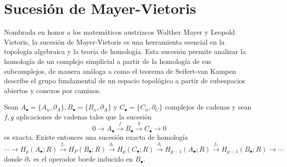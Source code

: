 \section{Sucesión de Mayer-Vietoris}
Nombrada en honor a los matemáticos austriacos Walther Mayer y Leopold Vietoris, la sucesión de Mayer-Vietoris es una herramienta esencial en la topología algebraica y la teoría de homología. Esta sucesión permite analizar la homología de un complejo simplicial a partir de la homología de sus subcomplejos, de manera análoga a como el teorema de Seifert-van Kampen describe el grupo fundamental de un espacio topológico a partir de subespacios abiertos y conexos por caminos.
\begin{lema}
	\label{lem:zig-zag}
	Sean $A_{\bullet} = \{A_n,\partial_A\}, B_{\bullet} = \{B_n,\partial_A\}$ y $C_{\bullet} = \{C_n,\partial_C\}$ complejos de cadenas y sean $f,g$ aplicaciones de cadenas tales que la sucesión
	\[
		0 \to A_{\bullet} \overset{f}{\to} B_{\bullet} \overset{g}{\to} C_{\bullet} \to 0
	\]
	es exacta. Existe entonces una sucesión exacta de homología
	\begin{equation}
		\label{eq:long-exact-hom}
	\cdots \to H_p(A_{\bullet};R) \overset{f_*}{\to} H_P(B_{\bullet};R) \overset{g_*}{\to} H_p(C_{\bullet};R) \overset{\partial_*}{\to} H_{p-1}(A_{\bullet};R) \overset{f_*}{\to} H_{p-1}(B_{\bullet};R) \to \cdots
	\end{equation}
	donde $\partial_*$ es el operador borde inducido en $B_{\bullet}$.
\end{lema}
